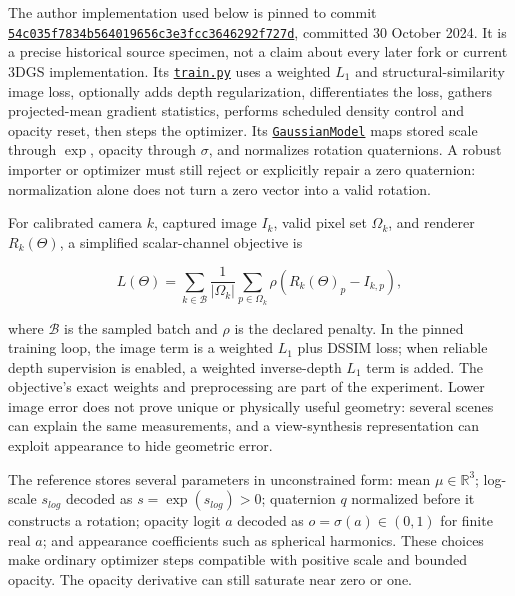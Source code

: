 The author implementation used below is pinned to commit \href{https://github.com/graphdeco-inria/gaussian-splatting/commit/54c035f7834b564019656c3e3fcc3646292f727d}{\texttt{54c035f7834b564019656c3e3fcc3646292f727d}}, committed 30 October 2024. It is a precise historical source specimen, not a claim about every later fork or current 3DGS implementation. Its \href{https://github.com/graphdeco-inria/gaussian-splatting/blob/54c035f7834b564019656c3e3fcc3646292f727d/train.py\#L126-L186}{\texttt{train.py}} uses a weighted \(L_1\) and structural-similarity image loss, optionally adds depth regularization, differentiates the loss, gathers projected-mean gradient statistics, performs scheduled density control and opacity reset, then steps the optimizer. Its \href{https://github.com/graphdeco-inria/gaussian-splatting/blob/54c035f7834b564019656c3e3fcc3646292f727d/scene/gaussian_model.py\#L39-L47}{\texttt{GaussianModel}} maps stored scale through \(\exp\), opacity through \(\sigma\), and normalizes rotation quaternions. A robust importer or optimizer must still reject or explicitly repair a zero quaternion: normalization alone does not turn a zero vector into a valid rotation.

For calibrated camera \(k\), captured image \(I_k\), valid pixel set \(\Omega_k\), and renderer \(R_k(\Theta)\), a simplified scalar-channel objective is

\[
L(\Theta)=\sum_{k\in\mathcal B}\frac{1}{|\Omega_k|}\sum_{p\in\Omega_k}\rho\left(R_k(\Theta)_p-I_{k,p}\right),
\]

where \(\mathcal B\) is the sampled batch and \(\rho\) is the declared penalty. In the pinned training loop, the image term is a weighted \(L_1\) plus DSSIM loss; when reliable depth supervision is enabled, a weighted inverse-depth \(L_1\) term is added. The objective's exact weights and preprocessing are part of the experiment. Lower image error does not prove unique or physically useful geometry: several scenes can explain the same measurements, and a view-synthesis representation can exploit appearance to hide geometric error.

The reference stores several parameters in unconstrained form: mean \(\mu\in\mathbb R^3\); log-scale \(s_{log}\) decoded as \(s=\exp(s_{log})>0\); quaternion \(q\) normalized before it constructs a rotation; opacity logit \(a\) decoded as \(o=\sigma(a)\in(0,1)\) for finite real \(a\); and appearance coefficients such as spherical harmonics. These choices make ordinary optimizer steps compatible with positive scale and bounded opacity. The opacity derivative can still saturate near zero or one.

